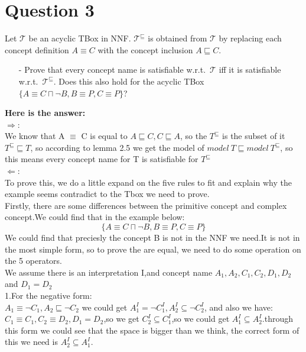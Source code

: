 \documentclass{article}
\begin{document}
    \section{Question 3}
    Let $\mathcal{T}$ be an acyclic TBox in NNF. $\mathcal{T}^{\sqsubseteq}$ is obtained from $\mathcal{T}$ by replacing each concept definition $A\equiv C$ with the concept inclusion $A\sqsubseteq C$.
    \begin{itemize}
        \item[-] Prove that every concept name is satisfiable w.r.t.\ $\mathcal{T}$ iff it is satisfiable w.r.t.\ $\mathcal{T}^{\sqsubseteq}$. Does this also hold for the acyclic TBox $\{A\equiv C\sqcap\neg B, B\equiv P, C\equiv P\}$?
    \end{itemize}
    \textbf{Here is the answer:}\\
    $\Rightarrow$:\\
    We know that A $\equiv$ C is equal to $A \sqsubseteq C,C \sqsubseteq A$, so the $T^{\sqsubseteq}$ is the subset of it $T^{\sqsubseteq} \sqsubseteq T$, so according to lemma 2.5 we get the model of 
    $model\ T \sqsubseteq model\ T^{\sqsubseteq}$, so this means every concept name for T is satisfiable for $T^{\sqsubseteq}$\\
    $\Leftarrow$:\\ 
    To prove this, we do a little expand on the five rules to fit and explain why the example seems contradict to the Tbox we need to prove.\\
    Firstly, there are some differences between the primitive concept and complex concept.We could find that in the example below:\\
    \[
        \{A\equiv C\sqcap\neg B, B\equiv P, C\equiv P\}
    \]
    We could find that preciesly the concept B is not in the NNF we need.It is not in the most simple form, so to prove the are equal, we need to do some operation 
    on the 5 operators.\\
    We assume there is an interpretation I,and concept name $A_1,A_2,C_1,C_2,D_1,D_2$ and $D_1 = D_2$\\
    1.For the negative form:\\
    $A_1 \equiv \neg C_1,A_2 \sqsubseteq \neg C_2$ we could get $A_1^I = \neg C_1^I,A_2^I \subseteq \neg C_2^I$, and also we have:$C_1 \equiv C_1,C_2 \equiv D_2,D_1 = D_2$,so we get
    $C_2^I \subseteq C_1^I$,so we could get $A_1^I \subseteq A_2^I$.through this form we could see that the space is bigger than we think, the correct form of this we need is $A_2^I \subseteq A_1^I$.\\
\end{document}
